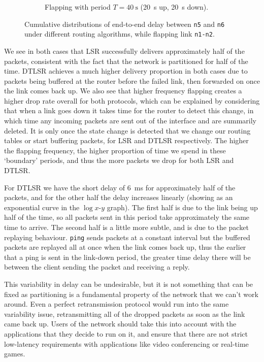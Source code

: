 \documentclass[withindex,glossary,openany]{cam-thesis}
\begin{document}
\begin{figure}[H]
\begin{subfigure}{.5\textwidth}
  \caption{Flapping with period $T=\SI{40}{\s}$ (\SI{20}{\s} up, \SI{20}{\s} down).}
  \label{fig:partition_20}
\end{subfigure}
\caption{Cumulative distributions of end-to-end delay between \texttt{n5} and \texttt{n6} under different routing algorithms, while flapping link \texttt{n1-n2}.}
\label{fig:partition}
\end{figure}

We see in both cases that LSR successfully delivers approximately half of the packets, consistent with the fact that the network is partitioned for half of the time. DTLSR achieves a much higher delivery proportion in both cases due to packets being buffered at the router before the failed link, then forwarded on once the link comes back up. We also see that higher frequency flapping creates a higher drop rate overall for both protocols, which can be explained by considering that when a link goes down it takes time for the router to detect this change, in which time any incoming packets are sent out of the interface and are summarily deleted. It is only once the state change is detected that we change our routing tables or start buffering packets, for LSR and DTLSR respectively. The higher the flapping frequency, the higher proportion of time we spend in these `boundary' periods, and thus the more packets we drop for both LSR and DTLSR.

For DTLSR we have the short delay of \SI{6}{\ms} for approximately half of the packets, and for the other half the delay increases linearly (showing as an exponential curve in the $\log x$-$y$ graph). The first half is due to the link being up half of the time, so all packets sent in this period take approximately the same time to arrive. The second half is a little more subtle, and is due to the packet replaying behaviour. \texttt{ping} sends packets at a constant interval but the buffered packets are replayed all at once when the link comes back up, thus the earlier that a ping is sent in the link-down period, the greater time delay there will be between the client sending the packet and receiving a reply.

This variability in delay can be undesirable, but it is not something that can be fixed as partitioning is a fundamental property of the network that we can't work around. Even a perfect retransmission protocol would run into the same variability issue, retransmitting all of the dropped packets as soon as the link came back up. Users of the network should take this into account with the applications that they decide to run on it, and ensure that there are not strict low-latency requirements with applications like video conferencing or real-time games.
\end{document}
